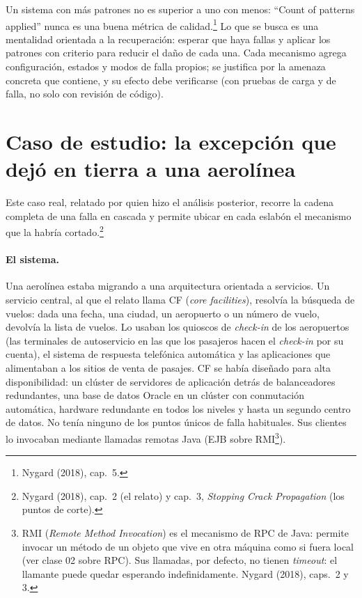 \documentclass[variant=apuntes,cover=institutional,mode=screen]{ua-engineering-v6-article}
\begin{document}
Un sistema con más patrones no es superior a uno con menos: ``Count of patterns applied'' nunca es una buena métrica de calidad.\footnote{Nygard (2018), cap.~5.} Lo que se busca es una mentalidad orientada a la recuperación: esperar que haya fallas y aplicar los patrones con criterio para reducir el daño de cada una. Cada mecanismo agrega configuración, estados y modos de falla propios; se justifica por la amenaza concreta que contiene, y su efecto debe verificarse (con pruebas de carga y de falla, no solo con revisión de código).

\section{Caso de estudio: la excepción que dejó en tierra a una aerolínea}\label{sec:aerolinea}

Este caso real, relatado por quien hizo el análisis posterior, recorre la cadena completa de una falla en cascada y permite ubicar en cada eslabón el mecanismo que la habría cortado.\footnote{Nygard (2018), cap.~2 (el relato) y cap.~3, \emph{Stopping Crack Propagation} (los puntos de corte).}

\paragraph{El sistema.} Una aerolínea estaba migrando a una arquitectura orientada a servicios. Un servicio central, al que el relato llama CF (\emph{core facilities}), resolvía la búsqueda de vuelos: dada una fecha, una ciudad, un aeropuerto o un número de vuelo, devolvía la lista de vuelos. Lo usaban los quioscos de \emph{check-in} de los aeropuertos (las terminales de autoservicio en las que los pasajeros hacen el \emph{check-in} por su cuenta), el sistema de respuesta telefónica automática y las aplicaciones que alimentaban a los sitios de venta de pasajes. CF se había diseñado para alta disponibilidad: un clúster de servidores de aplicación detrás de balanceadores redundantes, una base de datos Oracle en un clúster con conmutación automática, hardware redundante en todos los niveles y hasta un segundo centro de datos. No tenía ninguno de los puntos únicos de falla habituales. Sus clientes lo invocaban mediante llamadas remotas Java (EJB sobre RMI\footnote{RMI (\emph{Remote Method Invocation}) es el mecanismo de RPC de Java: permite invocar un método de un objeto que vive en otra máquina como si fuera local (ver clase 02 sobre RPC). Sus llamadas, por defecto, no tienen \emph{timeout}: el llamante puede quedar esperando indefinidamente. Nygard (2018), caps.~2 y 3.}).
\end{document}
